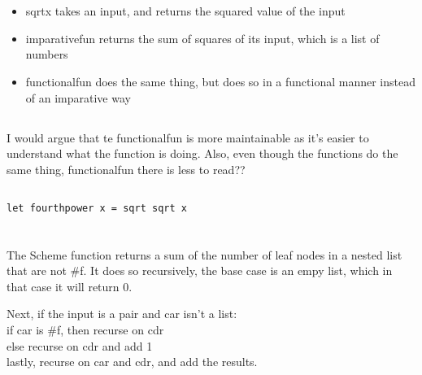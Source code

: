 \documentclass[letterpaper]{article}
\begin{document}
\section{}

\subsection{}
\begin{itemize}
  \item sqrtx takes an input, and returns the squared value of the input
  \item imparativefun returns the sum of squares of its input, which is a list of numbers
  \item functionalfun does the same thing, but does so in a functional manner instead of an imparative way
\end{itemize}

\subsection{}
I would argue that te functionalfun is more maintainable as it's easier to
understand what the function is doing. Also, even though the functions do the
same thing, functionalfun there is less to read?? \todo{}

\subsection{}
\begin{verbatim}
let fourthpower x = sqrt sqrt x
\end{verbatim}

\section{}
The Scheme function returns a sum of the number of leaf nodes in a nested list
that are not \#f.
It does so recursively, the base case is an empy list, which in that case it
will return 0.

Next, if the input is a pair and car isn't a list:\\
   if car is \#f, then recurse on cdr\\
   else recurse on cdr and add 1\\

   lastly, recurse on car and cdr, and add the results.
\end{document}
